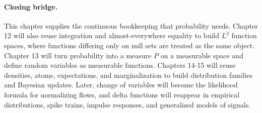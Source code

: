 \paragraph{Closing bridge.}
This chapter supplies the continuous bookkeeping that probability needs. Chapter 12 will also reuse integration and almost-everywhere equality to build \(L^2\) function spaces, where functions differing only on null sets are treated as the same object. Chapter 13 will turn probability into a measure \(P\) on a measurable space and define random variables as measurable functions. Chapters 14-15 will reuse densities, atoms, expectations, and marginalization to build distribution families and Bayesian updates. Later, change of variables will become the likelihood formula for normalizing flows, and delta functions will reappear in empirical distributions, spike trains, impulse responses, and generalized models of signals.

\clearpage
